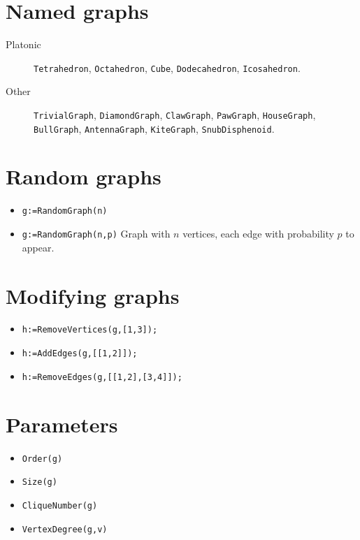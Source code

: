 \documentclass[11pt]{article}
\begin{document}
\begin{multicols}{3}
\section{Named graphs}
\label{sec:orgheadline3}
\begin{description}
\item[{Platonic}] \texttt{Tetrahedron}, \texttt{Octahedron}, \texttt{Cube}, \texttt{Dodecahedron}, \texttt{Icosahedron}.
\item[{Other}] \texttt{TrivialGraph}, \texttt{DiamondGraph}, \texttt{ClawGraph}, \texttt{PawGraph},
\texttt{HouseGraph}, \texttt{BullGraph}, \texttt{AntennaGraph}, \texttt{KiteGraph}, \texttt{SnubDisphenoid}.
\end{description}
\section{Random graphs}
\label{sec:orgheadline4}

\begin{itemize}
\item \texttt{g:=RandomGraph(n)}
\item \texttt{g:=RandomGraph(n,p)} Graph with \(n\) vertices, each edge with
probability \(p\) to appear.
\end{itemize}

\section{Modifying graphs}
\label{sec:orgheadline5}

\begin{itemize}
\item \texttt{h:=RemoveVertices(g,[1,3]);}
\item \texttt{h:=AddEdges(g,[[1,2]]);}
\item \texttt{h:=RemoveEdges(g,[[1,2],[3,4]]);}
\end{itemize}

\section{Parameters}
\label{sec:orgheadline6}

\begin{itemize}
\item \texttt{Order(g)}
\item \texttt{Size(g)}
\item \texttt{CliqueNumber(g)}
\item \texttt{VertexDegree(g,v)}
\end{itemize}


\end{multicols}
\end{document}

